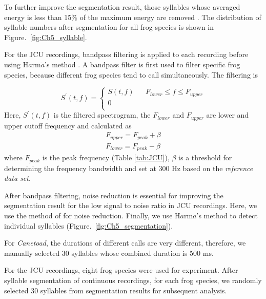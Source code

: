 To further improve the segmentation result, those syllables whose averaged energy is less than 15\% of the maximum energy are removed \citep{Gingras2013}. The distribution of syllable numbers after segmentation for all frog species is shown in Figure.~\ref{fig:Ch5_syllable}.


For the JCU recordings, bandpass filtering is applied to each recording before using H$\ddot{a}$rm$\ddot{a}$'s method \citep{harma2003automatic}. A bandpass filter is first used to filter specific frog species, because different frog species tend to call simultaneously.   The filtering is 

$$ S^{'}(t,f) =\left\{
\begin{array}{rcl}
 S(t,f) && F_{lower} \leq f　\leq F_{upper}  \\
0 \\
\end{array}
\right.
$$
Here, $S^{'}(t,f)$ is the filtered spectrogram, the $F_{lower}$ and  $F_{upper}$ are lower and upper cutoff frequency and calculated as 
\begin{equation}
\begin{aligned}
F_{upper} = F_{peak} + \beta \\
F_{lower} = F_{peak} - \beta
\end{aligned}
\end{equation}
\noindent where $F_{peak}$ is the peak frequency (Table \ref{tab:JCU}), $\beta$ is a threshold for determining the frequency bandwidth and set at 300 Hz based on the \textit{reference data set}.

After bandpass filtering, noise reduction is essential for
improving the segmentation result for the low
signal to noise ratio in JCU recordings. Here, we use the method of \cite{towsey2012toolbox} for noise reduction. Finally, we use H$\ddot{a}$rm$\ddot{a}$'s method to detect individual syllables (Figure.~\ref{fig:Ch5_segmentation}). 

For \textit{Canetoad}, the durations of different calls are very different, therefore, we manually selected 30 syllables whose combined duration is 500 ms.

For the JCU recordings, eight frog species were used for experiment. After syllable segmentation of continuous recordings, for each frog species, we randomly selected 30 syllables from segmentation results for subsequent analysis.


